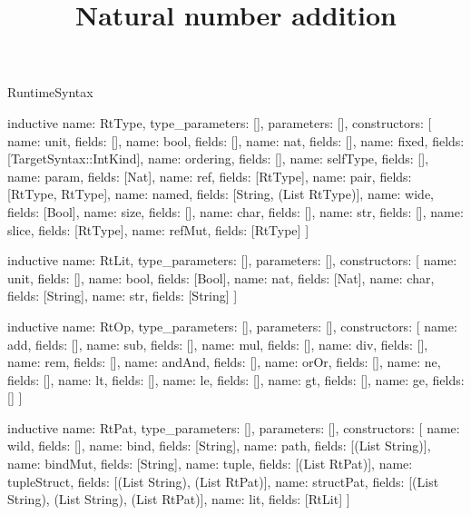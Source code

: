 \begin{lexlean}{RuntimeSyntax}
\title{Natural number addition}
\begin{semanticmodule}
inductive{
  name: RtType,
  type_parameters: [],
  parameters: [],
  constructors: [
    {name: unit, fields: []},
    {name: bool, fields: []},
    {name: nat, fields: []},
    {name: fixed, fields: [TargetSyntax::IntKind]},
    {name: ordering, fields: []},
    {name: selfType, fields: []},
    {name: param, fields: [Nat]},
    {name: ref, fields: [RtType]},
    {name: pair, fields: [RtType, RtType]},
    {name: named, fields: [String, (List RtType)]},
    {name: wide, fields: [Bool]},
    {name: size, fields: []},
    {name: char, fields: []},
    {name: str, fields: []},
    {name: slice, fields: [RtType]},
    {name: refMut, fields: [RtType]}
  ]
}

inductive{
  name: RtLit,
  type_parameters: [],
  parameters: [],
  constructors: [
    {name: unit, fields: []},
    {name: bool, fields: [Bool]},
    {name: nat, fields: [Nat]},
    {name: char, fields: [String]},
    {name: str, fields: [String]}
  ]
}

inductive{
  name: RtOp,
  type_parameters: [],
  parameters: [],
  constructors: [
    {name: add, fields: []},
    {name: sub, fields: []},
    {name: mul, fields: []},
    {name: div, fields: []},
    {name: rem, fields: []},
    {name: andAnd, fields: []},
    {name: orOr, fields: []},
    {name: ne, fields: []},
    {name: lt, fields: []},
    {name: le, fields: []},
    {name: gt, fields: []},
    {name: ge, fields: []}
  ]
}

inductive{
  name: RtPat,
  type_parameters: [],
  parameters: [],
  constructors: [
    {name: wild, fields: []},
    {name: bind, fields: [String]},
    {name: path, fields: [(List String)]},
    {name: bindMut, fields: [String]},
    {name: tuple, fields: [(List RtPat)]},
    {name: tupleStruct, fields: [(List String), (List RtPat)]},
    {name: structPat, fields: [(List String), (List String), (List RtPat)]},
    {name: lit, fields: [RtLit]}
  ]
}


\end{semanticmodule}
\end{lexlean}
